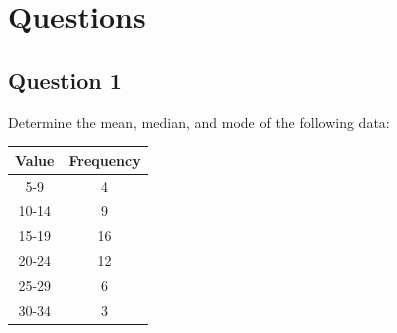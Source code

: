 \documentclass[12pt,titlepage]{article}
\begin{document}
\section{Questions}
\subsection{Question 1}
Determine the mean, median, and mode of the following data:

\begin{center}
    \begin{tabular}{|c|c|}
        \hline
        Value & Frequency \\
        \hline
        5-9 & 4 \\
        \hline
        10-14 & 9 \\
        \hline
        15-19 & 16 \\
        \hline
        20-24 & 12 \\
        \hline
        25-29 & 6 \\
        \hline
        30-34 & 3 \\
        \hline
    \end{tabular}
\end{center}
\end{document}
